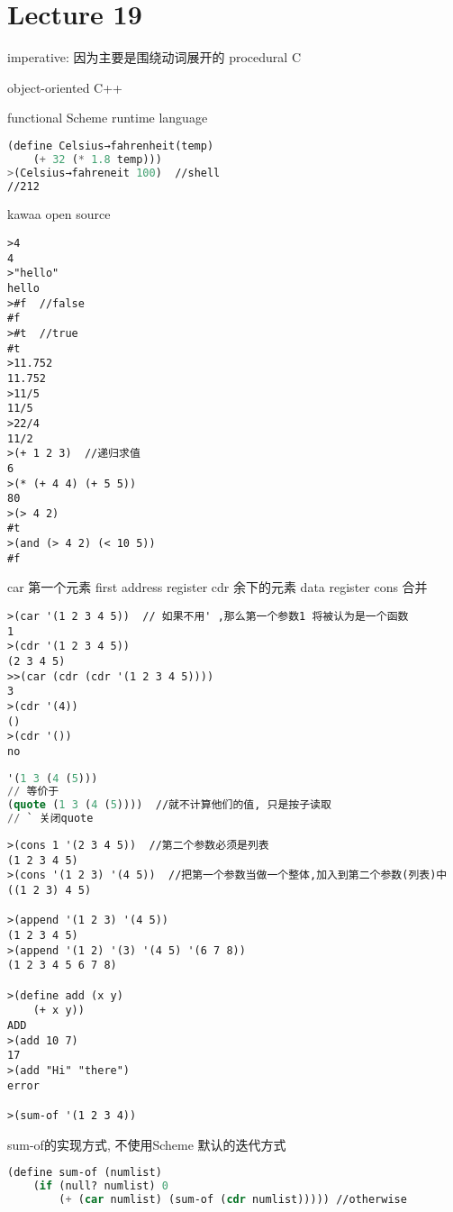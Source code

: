 \documentclass{article}
\begin{document}
\section{Lecture 19}
imperative: 因为主要是围绕动词展开的
procedural
C

object-oriented
C++

functional
Scheme	runtime language

\begin{lstlisting}[language = Lisp]
(define Celsius→fahrenheit(temp)
	(+ 32 (* 1.8 temp)))
>(Celsius→fahreneit 100)  //shell
//212
\end{lstlisting}

kawaa
open source
\begin{verbatim}
>4
4
>"hello"
hello
>#f  //false
#f
>#t  //true
#t
>11.752
11.752
>11/5
11/5
>22/4
11/2
>(+ 1 2 3)  //递归求值
6
>(* (+ 4 4) (+ 5 5))
80
>(> 4 2)
#t
>(and (> 4 2) (< 10 5))
#f
\end{verbatim}

car 第一个元素 first  address register
cdr 余下的元素  data register
cons 合并
\begin{verbatim}
>(car '(1 2 3 4 5))  // 如果不用' ,那么第一个参数1 将被认为是一个函数
1
>(cdr '(1 2 3 4 5))
(2 3 4 5)
>>(car (cdr (cdr '(1 2 3 4 5))))
3
>(cdr '(4))
()
>(cdr '())
no
\end{verbatim}

\begin{lstlisting}[language = Lisp]
'(1 3 (4 (5)))
// 等价于
(quote (1 3 (4 (5))))  //就不计算他们的值, 只是按子读取
// ` 关闭quote
\end{lstlisting}

\begin{verbatim}
>(cons 1 '(2 3 4 5))  //第二个参数必须是列表
(1 2 3 4 5)
>(cons '(1 2 3) '(4 5))  //把第一个参数当做一个整体,加入到第二个参数(列表)中
((1 2 3) 4 5)

>(append '(1 2 3) '(4 5))
(1 2 3 4 5)
>(append '(1 2) '(3) '(4 5) '(6 7 8))
(1 2 3 4 5 6 7 8)

>(define add (x y)
	(+ x y))
ADD
>(add 10 7)
17
>(add "Hi" "there")
error

>(sum-of '(1 2 3 4))
\end{verbatim}

sum-of的实现方式, 不使用Scheme 默认的迭代方式
\begin{lstlisting}[language = Lisp]
(define sum-of (numlist)
	(if (null? numlist) 0
		(+ (car numlist) (sum-of (cdr numlist))))) //otherwise
\end{lstlisting}
\end{document}
